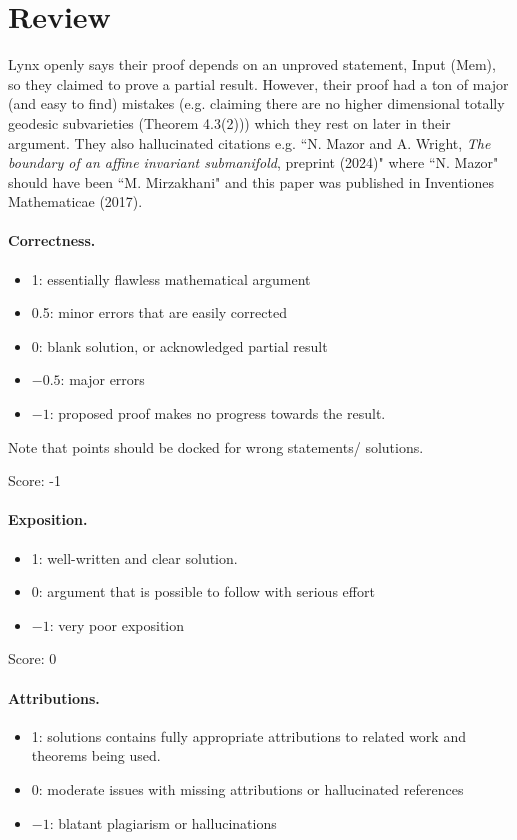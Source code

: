 \documentclass[11pt]{article}
\theoremstyle{definition}
\theoremstyle{remark}
\begin{document}
\maketitle

\section{Review}
Lynx openly says their proof depends on an unproved statement, Input (Mem), so they claimed to prove a partial result. However, their proof had a ton of major (and easy to find) mistakes (e.g. claiming there are no higher dimensional totally geodesic subvarieties (Theorem 4.3(2))) which they rest on later in their argument. They also hallucinated citations e.g. ``N. Mazor and A. Wright,
\emph{The boundary of an affine invariant submanifold}, preprint (2024)" where ``N. Mazor" should have been ``M. Mirzakhani" and this paper was published in Inventiones Mathematicae (2017). 
\paragraph{Correctness.}
\begin{itemize}
	\item  1: essentially flawless mathematical argument
	\item  0.5: minor errors that are easily corrected
	\item  0: blank solution, or acknowledged partial result
	\item  $-0.5$: major errors
	\item  $-1$: proposed proof makes no progress towards the result.
\end{itemize}
Note that points should be docked for wrong statements/ solutions.

\noindent Score: -1

\paragraph{Exposition.}
\begin{itemize}
	\item  1: well-written and clear solution.
	\item  0: argument that is possible to follow with serious effort
	\item  $-1$: very poor exposition
\end{itemize}

\noindent Score: 0

\paragraph{Attributions.}
\begin{itemize}
	\item  1: solutions contains fully appropriate attributions
		to related work and theorems being used.
	\item  0: moderate issues with missing attributions or hallucinated references
	\item  $-1$: blatant plagiarism or hallucinations
\end{itemize}
\end{document}
